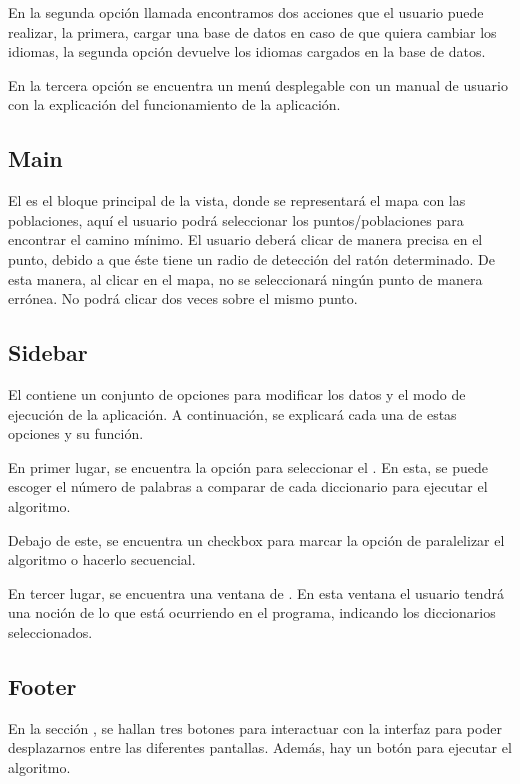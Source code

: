 En la segunda opción llamada  encontramos dos acciones que el usuario puede realizar, la primera, cargar una base de datos en caso de que quiera cambiar los idiomas, la segunda opción devuelve los idiomas cargados en la base de datos.\bigskip

En la tercera opción se encuentra un menú desplegable con un manual de usuario con la explicación del funcionamiento de la aplicación.
 
\subsection{Main}

El  es el bloque principal de la vista, donde se representará el mapa con las poblaciones, aquí el usuario podrá seleccionar los puntos/poblaciones para encontrar el camino mínimo. El usuario deberá clicar de manera precisa en el punto, debido a que éste tiene un radio de detección del ratón determinado. De esta manera, al clicar en el mapa, no se seleccionará ningún punto de manera errónea. No podrá clicar dos veces sobre el mismo punto.

\subsection{Sidebar}\label{Sidebar}

El  contiene un conjunto de opciones para modificar los datos y el modo de ejecución de la aplicación. A continuación, se explicará cada una de estas opciones y su función.\bigskip

En primer lugar, se encuentra la opción para seleccionar el . En esta, se puede escoger el número de palabras a comparar de cada diccionario para ejecutar el algoritmo. \bigskip

Debajo de este, se encuentra un checkbox para marcar la opción de paralelizar el algoritmo o hacerlo secuencial. \bigskip

En tercer lugar, se encuentra una ventana de . En esta ventana el usuario tendrá una noción de lo que está ocurriendo en el programa, indicando los diccionarios seleccionados.

\subsection{Footer}\label{Footer}

En la sección , se hallan tres botones para interactuar con la interfaz para poder desplazarnos entre las diferentes pantallas. Además, hay un botón  para ejecutar el algoritmo. \bigskip

